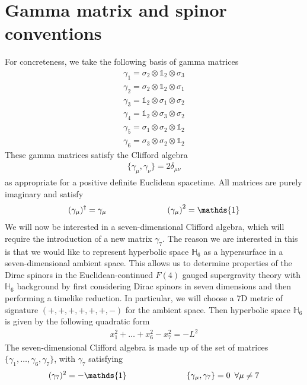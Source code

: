 \documentclass[12pt]{article}
\begin{document}
\section{Gamma matrix and spinor conventions }
\setcounter{equation}{0}
For concreteness, we take the following basis of gamma matrices
\begin{eqnarray}
\gamma_1 =\sigma_2 \otimes \mathds{1}_2 \otimes \sigma_3
\nonumber\\
\gamma_2 =\sigma_2 \otimes \mathds{1}_2 \otimes \sigma_1
\nonumber\\
\gamma_3 = \mathds{1}_2  \otimes \sigma_1  \otimes \sigma_2
\nonumber\\
\gamma_4 = \mathds{1}_2 \otimes \sigma_3  \otimes \sigma_2
\nonumber\\
\gamma_5 =\sigma_1 \otimes \sigma_2 \otimes \mathds{1}_2
\nonumber\\
\gamma_6 = \sigma_3 \otimes \sigma_2 \otimes \mathds{1}_2
\end{eqnarray}
These gamma matrices satisfy the Clifford algebra
\begin{eqnarray}
\{ \gamma_\mu, \gamma_\nu\} = 2 \delta_{\mu \nu} 
\end{eqnarray}
as appropriate for a positive definite Euclidean spacetime. All matrices are purely imaginary and satisfy 
\begin{eqnarray}
(\gamma_\mu)^\dagger = \gamma_\mu \hspace{1 in} \left(\gamma_\mu \right)^2 =  \mathds{1}
\end{eqnarray}
We will now be interested in a seven-dimensional Clifford algebra, which will require the introduction of a new matrix $\gamma_7$. The reason we are interested in this is that we would like to represent hyperbolic space $\mathbb{H}_6$ as a hypersurface in a seven-dimensional ambient space. This allows us to determine properties of the Dirac spinors in the Euclidean-continued $F(4)$ gauged supergravity theory with $\mathbb{H}_6$ background by first considering Dirac spinors in seven dimensions and then performing a timelike reduction. In particular, we will choose a 7D metric of signature $(+,+,+,+,+,+,-)$ for the ambient space. Then hyperbolic space $\mathbb{H}_6$ is given by the following quadratic form
\begin{eqnarray}
x_1^2 + \dots +x_6^2 - x_7^2 = - L^2 
\end{eqnarray} 
The seven-dimensional Clifford algebra is made up of the set of matrices $\{ \gamma_1, \dots, \gamma_6, \gamma_7\}$, with $\gamma_7$ satisfying 
\begin{eqnarray}
(\gamma_7)^2 = - \mathds{1} \hspace{1 in} \{ \gamma_\mu, \gamma_7\} = 0 \,\,\,\forall \mu \neq 7
\end{eqnarray}
\end{document}

